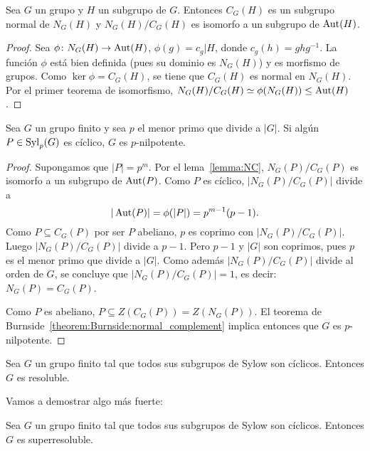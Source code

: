 

\begin{lemma}
	\label{lemma:NC}
	Sea $G$ un grupo y $H$ un subgrupo de $G$. Entonces $C_G(H)$ es un subgrupo
	normal de $N_G(H)$ y $N_G(H)/C_G(H)$ es isomorfo a un subgrupo de
	$\operatorname{Aut}(H)$.
\end{lemma}

\begin{proof}
	Sea $\phi\colon N_G(H)\to\operatorname{Aut}(H)$,  $\phi(g)=c_g|H$, donde
	$c_g(h)=ghg^{-1}$.  La función $\phi$ está bien definida (pues su dominio
	es $N_G(H)$) y es morfismo de grupos. Como $\ker\phi=C_G(H)$, se tiene que
	$C_G(H)$ es normal en $N_G(H)$. Por el primer teorema de isomorfismo,
	$N_G(H)/C_G(H)\simeq\phi(N_G(H))\leq\operatorname{Aut}(H)$.
\end{proof}

\begin{corollary}
	\label{corollary:Sylow_ciclico}
	Sea $G$ un grupo finito y sea $p$ el menor primo que divide a $|G|$. Si
	algún $P\in\mathrm{Syl}_p(G)$ es cíclico, $G$ es $p$-nilpotente.
\end{corollary}

\begin{proof}
	Supongamos que $|P|=p^m$.  Por el lema~\ref{lemma:NC}, $N_G(P)/C_G(P)$ es
	isomorfo a un subgrupo de $\operatorname{Aut}(P)$. Como $P$ es cíclico, $|N_G(P)/C_G(P)|$ divide a 
	\[
		|\operatorname{Aut}(P)|=\phi(|P|)=p^{m-1}(p-1).
	\]
	Como $P\subseteq C_G(P)$ por ser $P$ abeliano, $p$ es coprimo con
	$|N_G(P)/C_G(P)|$.  Luego $|N_G(P)/C_G(P)|$ divide a $p-1$. Pero $p-1$ y
	$|G|$ son coprimos, pues $p$ es el menor primo que divide a $|G|$.  Como
	además $|N_G(P)/C_G(P)|$ divide al orden de $G$, se concluye que
	$|N_G(P)/C_G(P)|=1$, es decir: $N_G(P)=C_G(P)$. 

	Como $P$ es abeliano, $P\subseteq Z(C_G(P))=Z(N_G(P))$. El teorema de
	Burnside~\ref{theorem:Burnside:normal_complement} implica entonces que $G$
	es $p$-nilpotente. 
\end{proof}

\begin{exercise}
	Sea $G$ un grupo finito tal que todos sus subgrupos de Sylow son cíclicos.
	Entonces $G$ es resoluble.
\end{exercise}

Vamos a demostrar algo más fuerte:

\begin{corollary}
	\label{corollary:Sylow_ciclicos:resoluble}
	Sea $G$ un grupo finito tal que todos sus subgrupos de Sylow son cíclicos.
	Entonces $G$ es superresoluble.
\end{corollary}

